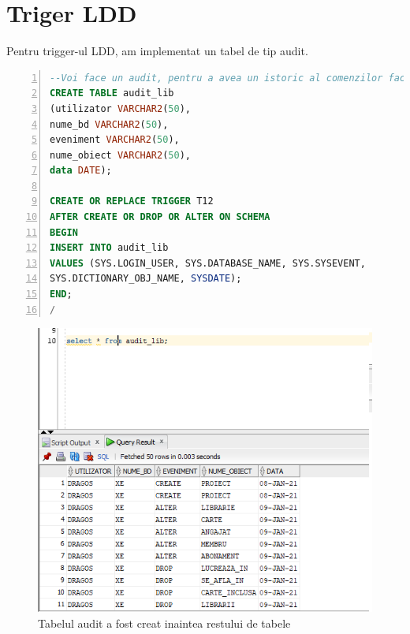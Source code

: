 \documentclass[12pt]{article}
\begin{document}
\section{Triger LDD}
Pentru trigger-ul LDD, am implementat un tabel de tip audit.\\
\begin{lstlisting}[language=SQL,
	showspaces=false,
	basicstyle=\ttfamily,
	numbers=left,
	numberstyle=\tiny,
	breaklines=true,
	commentstyle=\color{gray}]
--Voi face un audit, pentru a avea un istoric al comenzilor facute pe baza de date.
CREATE TABLE audit_lib
(utilizator VARCHAR2(50),
nume_bd VARCHAR2(50),
eveniment VARCHAR2(50),
nume_obiect VARCHAR2(50),
data DATE);

CREATE OR REPLACE TRIGGER T12
AFTER CREATE OR DROP OR ALTER ON SCHEMA
BEGIN
INSERT INTO audit_lib
VALUES (SYS.LOGIN_USER, SYS.DATABASE_NAME, SYS.SYSEVENT,
SYS.DICTIONARY_OBJ_NAME, SYSDATE);
END;
/
\end{lstlisting}	
\begin{figure}[!htb]
\includegraphics[max width=\linewidth]{imgs/ex12.png}
\caption{Tabelul audit a fost creat inaintea restului de tabele}
\label{fig:ex12}
\end{figure}
\end{document}
